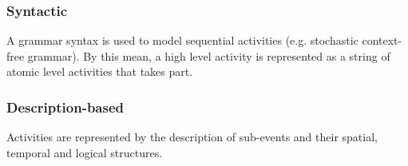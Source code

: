 \documentclass[a4paper, 12pt, openany, oneside]{book}
\begin{document}
\subsubsection{Syntactic}
A grammar syntax is used to model sequential activities (e.g. stochastic context-free grammar). 
By this mean, a high level activity is represented as a string of atomic level activities that takes part.

\subsubsection{Description-based}
Activities are represented by the description of sub-events and their spatial, temporal and logical structures.








% 





\clearpage


%
\end{document}
